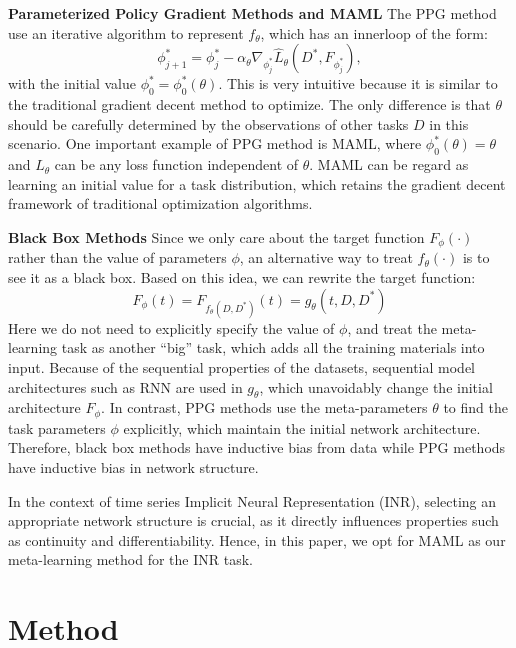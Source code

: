\documentclass{article}
\begin{document}
\textbf{Parameterized Policy Gradient Methods and MAML}
The PPG method use an iterative algorithm to represent $f_\theta$, which has an innerloop of the form:
$$
\phi^*_{j+1}=\phi_j^*-\alpha_\theta \nabla_{\phi_j^*} \hat{L}_\theta\left(D^*, F_{\phi_j^*}\right),
$$
with the initial value $\phi_0^*=\phi_0^*(\theta)$.
This is very intuitive because it is similar to the traditional gradient decent method to optimize. 
The only difference is that $\theta$ should be carefully determined by the observations of other tasks $D$ in this scenario.
One important example of PPG method is MAML, where $\phi_0^*(\theta)=\theta$ and $\hat{L}_\theta$ can be any loss function independent of $\theta$.
MAML can be regard as learning an initial value for a task distribution, which retains the gradient decent framework of traditional optimization algorithms.


\textbf{Black Box Methods}
Since we only care about the target function $F_\phi(\cdot)$ rather than the value of parameters $\phi$, an alternative way to treat $f_\theta(\cdot)$ is to see it as a black box. Based on this idea, we can rewrite the target function:
$$
F_\phi(t)=F_{f_\theta(D,D^*)}(t)=g_\theta(t,D,D^*)
$$
Here we do not need to explicitly specify the value of $\phi$, and treat the meta-learning task as another ``big'' task, which adds all the training materials into input.
Because of the sequential properties of the datasets, sequential model architectures such as RNN are used in $g_\theta$, which unavoidably change the initial architecture $F_\phi$.
In contrast, PPG methods use the meta-parameters $\theta$ to find the task parameters $\phi$ explicitly, which maintain the initial network architecture.
Therefore, black box methods have inductive bias from data while PPG methods have inductive bias in network structure.

In the context of time series Implicit Neural Representation (INR), selecting an appropriate network structure is crucial, as it directly influences properties such as continuity and differentiability.
Hence, in this paper, we opt for MAML as our meta-learning method for the INR task.

\section{Method}
\end{document}
